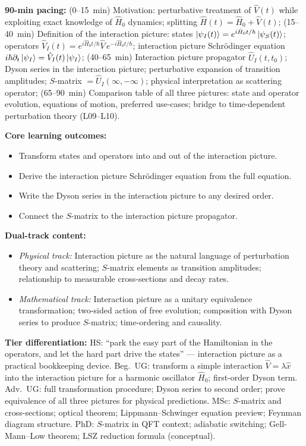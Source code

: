 \documentclass[11pt,a4paper]{article}
\begin{document}
\medskip
\begin{tcolorbox}[modulebox, title={Module~I.3 / L08: The Dirac (Interaction) Picture}]
\textbf{90-min pacing:} (0--15~min) Motivation: perturbative treatment of $\hat{V}(t)$
while exploiting exact knowledge of $\hat{H}_0$ dynamics;
splitting $\hat{H}(t)=\hat{H}_0+\hat{V}(t)$;
(15--40~min) Definition of the interaction picture:
states $\ket{\psi_I(t)}=e^{i\hat{H}_0 t/\hbar}\ket{\psi_S(t)}$;
operators $\hat{V}_I(t)=e^{i\hat{H}_0 t/\hbar}\hat{V}\,e^{-i\hat{H}_0 t/\hbar}$;
interaction picture Schr\"odinger equation $i\hbar\partial_t\ket{\psi_I}=\hat{V}_I(t)\ket{\psi_I}$;
(40--65~min) Interaction picture propagator $\hat{U}_I(t,t_0)$;
Dyson series in the interaction picture; perturbative expansion of transition amplitudes;
$S$-matrix $=\hat{U}_I(\infty,-\infty)$; physical interpretation as scattering operator;
(65--90~min) Comparison table of all three pictures: state and operator evolution,
equations of motion, preferred use-cases; bridge to time-dependent perturbation theory (L09--L10).

\medskip\textbf{Core learning outcomes:}
\begin{itemize}[leftmargin=1.4em,topsep=2pt,itemsep=1pt]
  \item Transform states and operators into and out of the interaction picture.
  \item Derive the interaction picture Schr\"odinger equation from the full equation.
  \item Write the Dyson series in the interaction picture to any desired order.
  \item Connect the $S$-matrix to the interaction picture propagator.
\end{itemize}

\medskip\textbf{Dual-track content:}
\begin{itemize}[leftmargin=1.4em,topsep=2pt,itemsep=1pt]
  \item \textit{Physical track:} Interaction picture as the natural language of
    perturbation theory and scattering; $S$-matrix elements as transition amplitudes;
    relationship to measurable cross-sections and decay rates.
  \item \textit{Mathematical track:} Interaction picture as a unitary equivalence
    transformation; two-sided action of free evolution; composition with Dyson series
    to produce $S$-matrix; time-ordering and causality.
\end{itemize}

\medskip\textbf{Tier differentiation:}
HS: ``park the easy part of the Hamiltonian in the operators, and let the hard part
drive the states'' --- interaction picture as a practical bookkeeping device.
Beg.\ UG: transform a simple interaction $\hat{V}=\lambda\hat{x}$ into the
interaction picture for a harmonic oscillator $\hat{H}_0$; first-order Dyson term.
Adv.\ UG: full transformation procedure; Dyson series to second order;
prove equivalence of all three pictures for physical predictions.
MSc: $S$-matrix and cross-sections; optical theorem;
Lippmann--Schwinger equation preview; Feynman diagram structure.
PhD: $S$-matrix in QFT context; adiabatic switching; Gell-Mann--Low theorem;
LSZ reduction formula (conceptual).


\end{tcolorbox}
\end{document}
